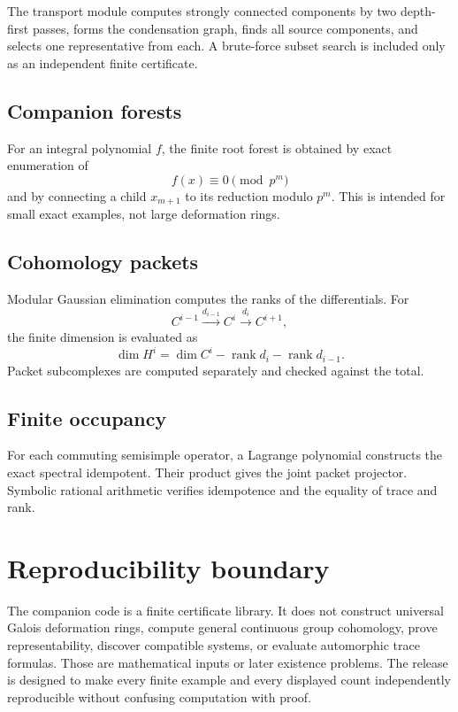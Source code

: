 \documentclass[11pt]{article}
\theoremstyle{definition}
\theoremstyle{remark}
\newcommand{\rank}{\operatorname{rank}}
\begin{document}
The transport module computes strongly connected components by two depth-first passes, forms the condensation graph, finds all source components, and selects one representative from each.  A brute-force subset search is included only as an independent finite certificate.

\subsection{Companion forests}

For an integral polynomial \(f\), the finite root forest is obtained by exact enumeration of
\[
f(x)\equiv0\pmod{p^m}
\]
and by connecting a child \(x_{m+1}\) to its reduction modulo \(p^m\).  This is intended for small exact examples, not large deformation rings.

\subsection{Cohomology packets}

Modular Gaussian elimination computes the ranks of the differentials.  For
\[
C^{i-1}\xrightarrow{d_{i-1}}C^i\xrightarrow{d_i}C^{i+1},
\]
the finite dimension is evaluated as
\[
\dim H^i
=
\dim C^i-\rank d_i-\rank d_{i-1}.
\]
Packet subcomplexes are computed separately and checked against the total.

\subsection{Finite occupancy}

For each commuting semisimple operator, a Lagrange polynomial constructs the exact spectral idempotent.  Their product gives the joint packet projector.  Symbolic rational arithmetic verifies idempotence and the equality of trace and rank.

\section{Reproducibility boundary}

The companion code is a finite certificate library.  It does not construct universal Galois deformation rings, compute general continuous group cohomology, prove representability, discover compatible systems, or evaluate automorphic trace formulas.  Those are mathematical inputs or later existence problems.  The release is designed to make every finite example and every displayed count independently reproducible without confusing computation with proof.
\end{document}
